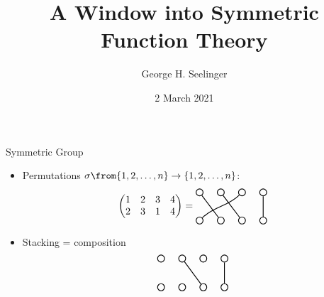 \documentclass{beamer}
\title[Symmetric Functions]{A Window into Symmetric Function Theory} %
\author[George H. Seelinger]{George H. Seelinger} %
\institute[UVA] %
{
  \medskip
\textit{ghs9ae@virginia.edu}\\ %
\medskip
UVA Math Club\\Lightning Round %
}
\date{2 March 2021} %
\begin{document}
\begin{frame}
 \titlepage 
\end{frame}
\begin{frame}{Symmetric Group}
  \begin{itemize}
  \item Permutations \(\sigma \from \{1,2,\ldots,n\} \to \{1,2,\ldots,n\}\):\pause \[
\left(
  \begin{matrix}
    1 & 2 & 3 & 4\\
    2 & 3 & 1 & 4 
  \end{matrix}
\right) = 
      \begin{tikzpicture}[scale = 0.5,thick, baseline={(0,-1ex/2)}] 
        \tikzstyle{vertex} = [shape = circle, minimum size = 7pt, inner sep = 1pt] 
        \node[vertex] (G--4) at (4.5, -1) [shape = circle, draw] {}; 
        \node[vertex] (G-4) at (4.5, 1) [shape = circle, draw] {}; 
        \node[vertex] (G--3) at (3.0, -1) [shape = circle, draw] {}; 
        \node[vertex] (G-2) at (1.5, 1) [shape = circle, draw] {}; 
        \node[vertex] (G--2) at (1.5, -1) [shape = circle, draw] {}; 
        \node[vertex] (G-1) at (0.0, 1) [shape = circle, draw] {}; 
        \node[vertex] (G--1) at (0.0, -1) [shape = circle, draw] {}; 
        \node[vertex] (G-3) at (3.0, 1) [shape = circle, draw] {}; 
        \draw[] (G-4) .. controls +(0, -1) and +(0, 1) .. (G--4); 
        \draw[] (G-2) .. controls +(0.75, -1) and +(-0.75, 1) .. (G--3); 
        \draw[] (G-1) .. controls +(0.75, -1) and +(-0.75, 1) .. (G--2); 
        \draw[] (G-3) .. controls +(-1, -1) and +(1, 1) .. (G--1); 
      \end{tikzpicture}
    \] \pause
  \item Stacking = composition \pause \[
      \begin{tikzpicture}[scale = 0.5,thick, baseline={(0,-3ex)}] 
        \tikzstyle{vertex} = [shape = circle, minimum size = 7pt, inner sep = 1pt] 
        \node[vertex] (G--4) at (4.5, -1) [shape = circle, draw] {}; 
        \node[vertex] (G-4) at (4.5, 1) [shape = circle, draw] {}; 
        \node[vertex] (G--3) at (3.0, -1) [shape = circle, draw] {}; 
        \node[vertex] (G-2) at (1.5, 1) [shape = circle, draw] {}; 
        \node[vertex] (G--2) at (1.5, -1) [shape = circle, draw] {}; 
        \node[vertex] (G-1) at (0.0, 1) [shape = circle, draw] {}; 
        \node[vertex] (G--1) at (0.0, -1) [shape = circle, draw] {}; 
        \node[vertex] (G-3) at (3.0, 1) [shape = circle, draw] {}; 
        \draw[] (G-4) .. controls +(0, -1) and +(0, 1) .. (G--4); 
        \draw[] (G-2) .. controls +(0.75, -1) and +(-0.75, 1) .. (G--3); 

\end{tikzpicture}\]
\end{itemize}
\end{frame}
\end{document}

